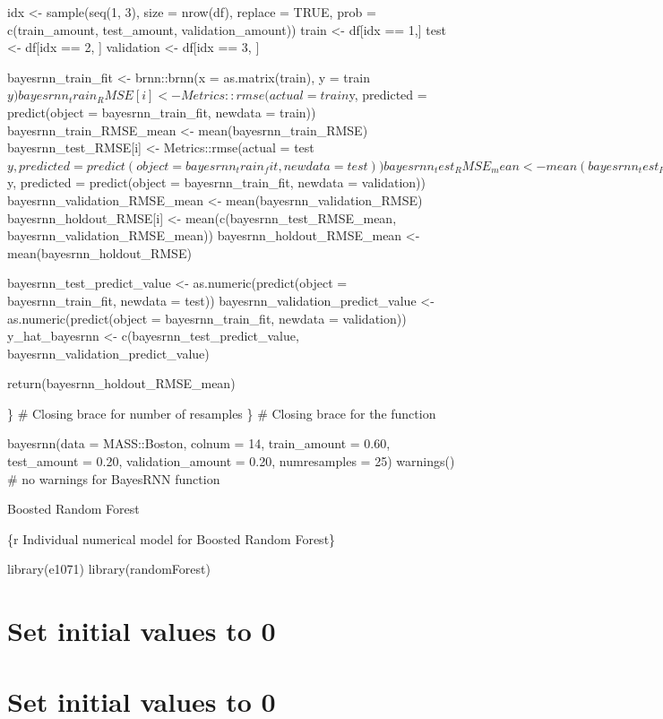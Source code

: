 \documentclass[
]{book}
\begin{document}
idx \textless- sample(seq(1, 3), size = nrow(df), replace = TRUE, prob =
c(train\_amount, test\_amount, validation\_amount)) train \textless- df{[}idx == 1,{]} test \textless- df{[}idx == 2, {]} validation \textless- df{[}idx == 3, {]}

bayesrnn\_train\_fit \textless- brnn::brnn(x = as.matrix(train), y = train\(y)
bayesrnn_train_RMSE[i] <- Metrics::rmse(actual = train\)y, predicted =
predict(object = bayesrnn\_train\_fit, newdata = train))
bayesrnn\_train\_RMSE\_mean \textless- mean(bayesrnn\_train\_RMSE)
bayesrnn\_test\_RMSE{[}i{]} \textless- Metrics::rmse(actual =
test\(y, predicted = predict(object = bayesrnn_train_fit, newdata = test))
bayesrnn_test_RMSE_mean <- mean(bayesrnn_test_RMSE)
bayesrnn_validation_RMSE[i] <- Metrics::rmse(actual = validation\)y,
predicted = predict(object = bayesrnn\_train\_fit, newdata = validation))
bayesrnn\_validation\_RMSE\_mean \textless- mean(bayesrnn\_validation\_RMSE)
bayesrnn\_holdout\_RMSE{[}i{]} \textless- mean(c(bayesrnn\_test\_RMSE\_mean,
bayesrnn\_validation\_RMSE\_mean)) bayesrnn\_holdout\_RMSE\_mean \textless-
mean(bayesrnn\_holdout\_RMSE)

bayesrnn\_test\_predict\_value \textless- as.numeric(predict(object =
bayesrnn\_train\_fit, newdata = test)) bayesrnn\_validation\_predict\_value
\textless- as.numeric(predict(object = bayesrnn\_train\_fit, newdata =
validation)) y\_hat\_bayesrnn \textless- c(bayesrnn\_test\_predict\_value,
bayesrnn\_validation\_predict\_value)

return(bayesrnn\_holdout\_RMSE\_mean)

\} \# Closing brace for number of resamples \} \# Closing brace for the
function

bayesrnn(data = MASS::Boston, colnum = 14, train\_amount = 0.60,
test\_amount = 0.20, validation\_amount = 0.20, numresamples = 25)
warnings() \# no warnings for BayesRNN function

Boosted Random Forest

\{r Individual numerical model for Boosted Random Forest\}

library(e1071) library(randomForest)

\chapter{Set initial values to 0}\label{set-initial-values-to-0-1}

\chapter{Set initial values to 0}\label{set-initial-values-to-0-2}
\end{document}
